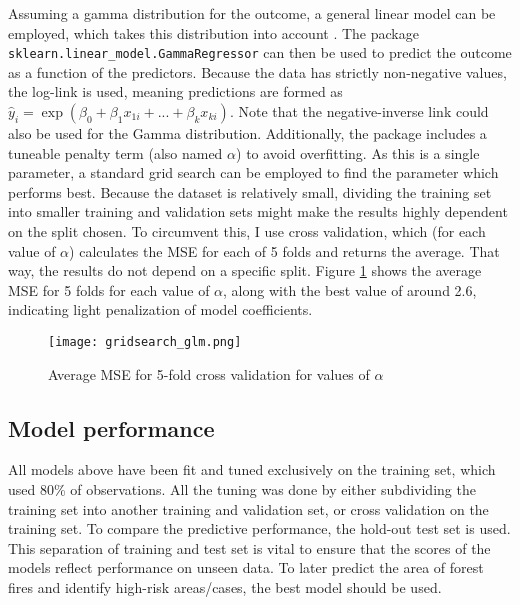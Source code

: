 \documentclass{article}
\begin{document}
Assuming a gamma distribution for the outcome, a general linear model can be employed, which takes this distribution into account \citep{glm}. The package \texttt{sklearn.linear\_model.GammaRegressor} can then be used to predict the outcome as a function of the predictors. Because the data has strictly non-negative values, the log-link is used, meaning predictions are formed as $\hat y_i = \exp (\beta_0 + \beta_1 x_{1i} + ... + \beta_k x_{ki} )$. Note that the negative-inverse link could also be used for the Gamma distribution. Additionally, the package includes a tuneable penalty term (also named $\alpha$) to avoid overfitting. As this is a single parameter, a standard grid search can be employed to find the parameter which performs best. Because the dataset is relatively small, dividing the training set into smaller training and validation sets might make the results highly dependent on the split chosen. To circumvent this, I use cross validation, which (for each value of $\alpha$) calculates the MSE for each of 5 folds and returns the average. That way, the results do not depend on a specific split. Figure \ref{fig:gridsearch_glm} shows the average MSE for 5 folds for each value of $\alpha$, along with the best value of around 2.6, indicating light penalization of model coefficients.

\begin{figure}[!htbp]
    \centering
    \texttt{[image: gridsearch\_glm.png]}
    \caption{Average MSE for 5-fold cross validation for values of $\alpha$}
    \label{fig:gridsearch_glm}
\end{figure}

\subsection{Model performance}

All models above have been fit and tuned exclusively on the training set, which used 80\% of observations. All the tuning was done by either subdividing the training set into another training and validation set, or cross validation on the training set. To compare the predictive performance, the hold-out test set is used. This separation of training and test set is vital to ensure that the scores of the models reflect performance on unseen data. To later predict the area of forest fires and identify high-risk areas/cases, the best model should be used.
\end{document}
